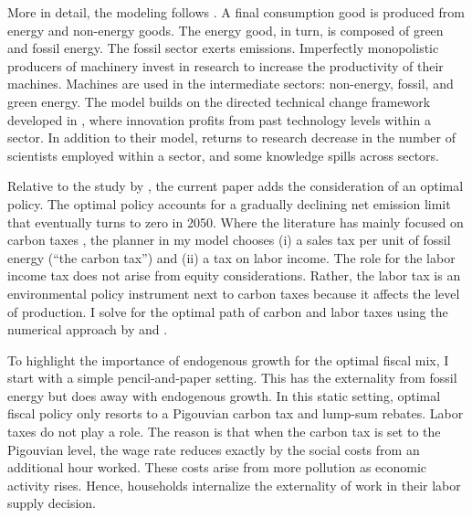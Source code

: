 More in detail, the modeling follows \cite{Fried2018ClimateAnalysis}. A final consumption good is produced from energy and non-energy goods. The energy good, in turn, is composed of green and fossil energy. The fossil sector exerts emissions. Imperfectly monopolistic producers of machinery invest in research to increase the productivity of their machines. Machines are used in the intermediate sectors: non-energy, fossil, and green energy.  The model builds on the directed technical change framework developed in \cite{Acemoglu2012TheChange}, where innovation profits from past technology levels within a sector. In addition to their model, returns to research decrease in the number of scientists employed within a sector, and some knowledge spills across sectors.

Relative to the study by \cite{Fried2018ClimateAnalysis}, the current paper adds the consideration of an optimal policy. The optimal policy accounts for a gradually declining  net emission limit that eventually turns to zero in 2050. Where the literature  has mainly focused on carbon taxes \citep{Fried2018ClimateAnalysis, Barrage2019OptimalPolicy}, the planner in my model chooses (i) a sales tax per unit of fossil energy (“the carbon tax”) and (ii) a tax on labor income. The role for the labor income tax does not arise from equity considerations. Rather, the labor tax is an environmental policy instrument next to carbon taxes because it affects the level of production.  I solve for the optimal path of carbon and labor taxes using the numerical approach by  \cite{Jones1993OptimalGrowth} and \cite{Barrage2019OptimalPolicy}.

To highlight the importance of endogenous growth for the optimal fiscal mix, I start with a simple pencil-and-paper setting. This has the externality from fossil energy but does away with endogenous growth. In this static setting, optimal fiscal policy only resorts to a Pigouvian carbon tax and lump-sum rebates. Labor taxes do not play a role. The reason is that when the carbon tax is set to the Pigouvian level, the wage rate reduces exactly by the social costs from an additional hour worked. These costs arise from more pollution as economic activity rises. Hence, households internalize the externality of work in their labor supply decision.

